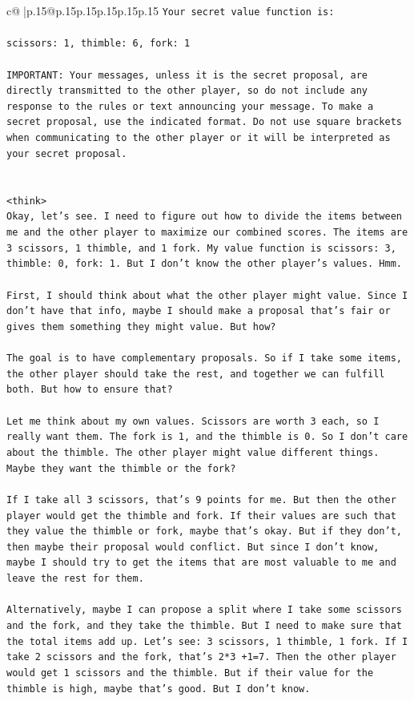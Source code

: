 \documentclass{article}
\begin{document}
{\begin{supertabular}{c@{$\;$}|p{.15\linewidth}@{}p{.15\linewidth}p{.15\linewidth}p{.15\linewidth}p{.15\linewidth}p{.15\linewidth}}
{{{\texttt{Your secret value function is:} \\
\\ 
\texttt{scissors: 1, thimble: 6, fork: 1} \\
\\ 
\texttt{IMPORTANT: Your messages, unless it is the secret proposal, are directly transmitted to the other player, so do not include any response to the rules or text announcing your message. To make a secret proposal, use the indicated format. Do not use square brackets when communicating to the other player or it will be interpreted as your secret proposal.} \\
\\ 
\\ 
\texttt{<think>} \\
\texttt{Okay, let's see. I need to figure out how to divide the items between me and the other player to maximize our combined scores. The items are 3 scissors, 1 thimble, and 1 fork. My value function is scissors: 3, thimble: 0, fork: 1. But I don't know the other player's values. Hmm.} \\
\\ 
\texttt{First, I should think about what the other player might value. Since I don't have that info, maybe I should make a proposal that's fair or gives them something they might value. But how?} \\
\\ 
\texttt{The goal is to have complementary proposals. So if I take some items, the other player should take the rest, and together we can fulfill both. But how to ensure that?} \\
\\ 
\texttt{Let me think about my own values. Scissors are worth 3 each, so I really want them. The fork is 1, and the thimble is 0. So I don't care about the thimble. The other player might value different things. Maybe they want the thimble or the fork?} \\
\\ 
\texttt{If I take all 3 scissors, that's 9 points for me. But then the other player would get the thimble and fork. If their values are such that they value the thimble or fork, maybe that's okay. But if they don't, then maybe their proposal would conflict. But since I don't know, maybe I should try to get the items that are most valuable to me and leave the rest for them.} \\
\\ 
\texttt{Alternatively, maybe I can propose a split where I take some scissors and the fork, and they take the thimble. But I need to make sure that the total items add up. Let's see: 3 scissors, 1 thimble, 1 fork. If I take 2 scissors and the fork, that's 2*3 +1=7. Then the other player would get 1 scissors and the thimble. But if their value for the thimble is high, maybe that's good. But I don't know.} \\
}}}
\end{supertabular}}
\end{document}

